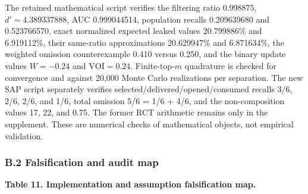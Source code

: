 \documentclass[
  11pt]{article}
\begin{document}
The retained mathematical script verifies the filtering ratio 0.998875,
\(d'=4.389337888\), AUC 0.999044514, population recalls 0.209639680 and
0.523766570, exact normalized expected leaked values 20.799886\% and
6.919112\%, their same-ratio approximations 20.629947\% and 6.871634\%,
the weighted omission counterexample 0.410 versus 0.250, and the binary
update values \(W=-0.24\) and \(\mathrm{VOI}=0.24\). Finite-top-\(m\)
quadrature is checked for convergence and against 20,000 Monte Carlo
realizations per separation. The new SAP script separately verifies
selected/delivered/opened/consumed recalls 3/6, 2/6, 2/6, and 1/6, total
omission 5/6 = 1/6 + 4/6, and the non-composition values 17, 22, and
0.75. The former RCT arithmetic remains only in the supplement. These
are numerical checks of mathematical objects, not empirical validation.

\subsubsection{B.2 Falsification and audit
map}\label{b.2-falsification-and-audit-map}

\textbf{Table 11. Implementation and assumption falsification map.}
\end{document}
